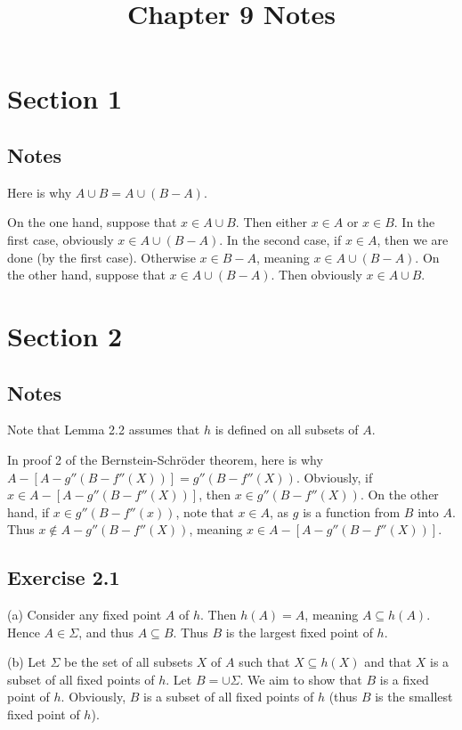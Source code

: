 \documentclass{article}
\title{Chapter 9 Notes}
\theoremstyle{definition}
\begin{document}
\date{}
\maketitle

\section*{Section 1}

\subsection*{Notes}
Here is why $A\cup B=A\cup (B-A)$.

On the one hand, suppose that $x\in A\cup B$. Then either $x\in A$ or $x\in B$. In the first case, obviously 
$x\in A\cup (B-A)$. In the second case, if $x\in A$, then we are done (by the first case). Otherwise $x\in B-A$, meaning 
$x\in A\cup (B-A)$. On the other hand, suppose that $x\in A\cup (B-A)$. Then obviously $x\in A\cup B$.

\section*{Section 2}

\subsection*{Notes}
Note that Lemma 2.2 assumes that $h$ is defined on all subsets of $A$.

In proof 2 of the Bernstein-Schröder theorem, here is why $A-[A-g''(B-f''(X))]=g''(B-f''(X))$. 
Obviously, if $x\in A-[A-g''(B-f''(X))]$, then $x\in g''(B-f''(X))$. On the other hand, if 
$x\in g''(B-f''(x))$, note that $x\in A$, as $g$ is a function from $B$ into $A$. Thus 
$x\notin A-g''(B-f''(X))$, meaning $x\in A-[A-g''(B-f''(X))]$.

\subsection*{Exercise 2.1}
(a) Consider any fixed point $A$ of $h$. Then $h(A)=A$, meaning $A\subseteq h(A)$. Hence $A\in\Sigma$, and thus 
$A\subseteq B$. Thus $B$ is the largest fixed point of $h$.

(b) Let $\Sigma$ be the set of all subsets $X$ of $A$ such that $X\subseteq h(X)$ and that $X$ is a subset of all fixed 
points of $h$. Let $B=\cup\Sigma$. We aim to show that $B$ is a fixed point of $h$. Obviously, $B$ is a subset of all fixed 
points of $h$ (thus $B$ is the smallest fixed point of $h$).
	
\end{document}
